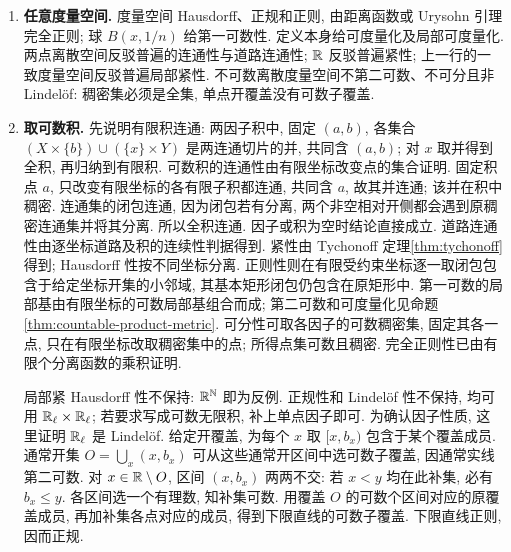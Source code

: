 \begin{solution}
\begin{enumerate}
任取开集 $U\supseteq H_0$, $V\supseteq H_1$. 递归构造有限集 $F_n$ 和相容单射 $q_n:F_n\to\{2,3,\ldots\}$. 从 $F_0=\varnothing$ 开始, 令 $f_n$ 在 $F_n$ 上等于 $q_n$, 外面为 $0$. 因 $f_n\in H_0$, 可取有限 $F_{n+1}\supseteq F_n$ 使 $[F_{n+1},f_n]\subseteq U$, 再把 $q_n$ 扩成单射 $q_{n+1}$. 令 $F=\bigcup_nF_n$, $q=\bigcup_nq_n$, 并令 $g$ 在 $F$ 上等于 $q$, 外面为 $1$; 则 $g\in H_1$. 取有限 $G$ 使 $[G,g]\subseteq V$, 再取 $n$ 使 $G\cap F\subseteq F_n$. 在 $G\cap F_{n+1}$ 上, $g$ 与 $f_n$ 一致, 因为这个交集落在 $F_n$ 内. 两组有限坐标条件相容, 所以 $[G,g]\cap[F_{n+1},f_n]\ne\varnothing$. 得 $U\cap V\ne\varnothing$, 证明 $X$ 非正规.

对不可数 $I$, 在 ZFC 中选择 $J\subseteq I$, $|J|=\aleph_1$. 闭子空间 $\mathbb N^J\times\{0\}^{I\setminus J}$ 同胚于上述 $X$; 正规性传给闭子空间, 所以 $\R^I$ 非正规. 它已是正则空间, 正则 Lindel\"of 空间正规, 故它也非 Lindel\"of. 这同时完成两格的不可数情形, 无须连续统假设. Stone 反例的来源见本章末尾; 上面的有限坐标论证已给出所需全部步骤.

\item \textbf{任意度量空间.}
度量空间 Hausdorff、正规和正则, 由距离函数或 Urysohn 引理完全正则; 球 $B(x,1/n)$ 给第一可数性. 定义本身给可度量化及局部可度量化. 两点离散空间反驳普遍的连通性与道路连通性; $\mathbb R$ 反驳普遍紧性; 上一行的一致度量空间反驳普遍局部紧性. 不可数离散度量空间不第二可数、不可分且非 Lindel\"of: 稠密集必须是全集, 单点开覆盖没有可数子覆盖.

\item \textbf{取可数积.}
先说明有限积连通: 两因子积中, 固定 $(a,b)$, 各集合 $(X\times\{b\})\cup(\{x\}\times Y)$ 是两连通切片的并, 共同含 $(a,b)$; 对 $x$ 取并得到全积, 再归纳到有限积. 可数积的连通性由有限坐标改变点的集合证明. 固定积点 $a$, 只改变有限坐标的各有限子积都连通, 共同含 $a$, 故其并连通; 该并在积中稠密. 连通集的闭包连通, 因为闭包若有分离, 两个非空相对开侧都会遇到原稠密连通集并将其分离. 所以全积连通. 因子或积为空时结论直接成立. 道路连通性由逐坐标道路及积的连续性判据得到. 紧性由 Tychonoff 定理\ref{thm:tychonoff}得到; Hausdorff 性按不同坐标分离. 正则性则在有限受约束坐标逐一取闭包包含于给定坐标开集的小邻域, 其基本矩形闭包仍包含在原矩形中. 第一可数的局部基由有限坐标的可数局部基组合而成; 第二可数和可度量化见命题\ref{thm:countable-product-metric}. 可分性可取各因子的可数稠密集, 固定其各一点, 只在有限坐标改取稠密集中的点; 所得点集可数且稠密. 完全正则性已由有限个分离函数的乘积证明.

局部紧 Hausdorff 性不保持: $\mathbb R^{\mathbb N}$ 即为反例. 正规性和 Lindel\"of 性不保持, 均可用 $\mathbb R_\ell\times\mathbb R_\ell$; 若要求写成可数无限积, 补上单点因子即可. 为确认因子性质, 这里证明 $\mathbb R_\ell$ 是 Lindel\"of. 给定开覆盖, 为每个 $x$ 取 $[x,b_x)$ 包含于某个覆盖成员. 通常开集 $O=\bigcup_x(x,b_x)$ 可从这些通常开区间中选可数子覆盖, 因通常实线第二可数. 对 $x\in\mathbb R\setminus O$, 区间 $(x,b_x)$ 两两不交: 若 $x<y$ 均在此补集, 必有 $b_x\le y$. 各区间选一个有理数, 知补集可数. 用覆盖 $O$ 的可数个区间对应的原覆盖成员, 再加补集各点对应的成员, 得到下限直线的可数子覆盖. 下限直线正则, 因而正规.


\end{enumerate}
\end{solution}
